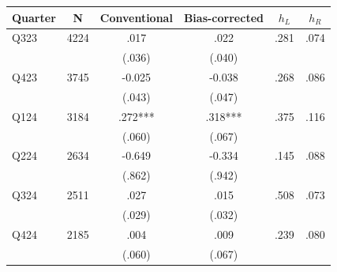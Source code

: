\begin{tabular}{lccccc}
\hline
Quarter & N & Conventional & Bias-corrected & $h_L$ & $h_R$ \\
\hline
Q323 & 4224 & .017 & .022 & .281 & .074
\\
 &  & (.036) & (.040) &  & 
\\
Q423 & 3745 & -0.025 & -0.038 & .268 & .086
\\
 &  & (.043) & (.047) &  & 
\\
Q124 & 3184 & .272*** & .318*** & .375 & .116
\\
 &  & (.060) & (.067) &  & 
\\
Q224 & 2634 & -0.649 & -0.334 & .145 & .088
\\
 &  & (.862) & (.942) &  & 
\\
Q324 & 2511 & .027 & .015 & .508 & .073
\\
 &  & (.029) & (.032) &  & 
\\
Q424 & 2185 & .004 & .009 & .239 & .080
\\
 &  & (.060) & (.067) &  & 
\\
\hline
\end{tabular}
